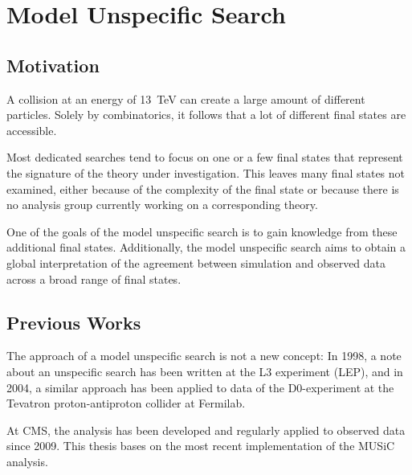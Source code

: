
\chapter{Model Unspecific Search}

\section{Motivation}
A collision at an energy of \SI{13}{\TeV} can create a large amount of different particles. Solely by combinatorics, it follows that a lot of different final states are accessible.

Most dedicated searches tend to focus on one or a few final states that represent the signature of the theory under investigation. This leaves many final states not examined, either because of the complexity of the final state or because there is no analysis group currently working on a corresponding theory.

One of the goals of the model unspecific search is to gain knowledge from these additional final states. Additionally, the model unspecific search aims to obtain a global interpretation of the agreement between simulation and observed data across a broad range of final states.

\section{Previous Works}
The approach of a model unspecific search is not a new concept: In 1998, a note about an unspecific search has been written at the L3 experiment (\ac{LEP})\cite{Hebbeker:GlobalComparisonL3}, and in 2004, a similar approach has been applied to data of the D0-experiment at the Tevatron proton-antiproton collider at Fermilab\cite{Biallass:ModelIndependentSearch}.

At \ac{CMS}, the analysis has been developed and regularly applied to observed data since 2009\cite{Schmitz:ModelUnspecificSearch,Hof:ImplementationModelIndependent,Dietz-Laursonn:ModelUnspecificSearch,Olschewski:StudyAlternativeStatistical,Brodski:ModelUnspecificSearch,Pieta:MUSiCModelUnspecific,Papacz:ModelUnspecificSearch,Albert:ExtensionModelUnspecific,Roemer:ModelUnspecificSearch,CMS:CMS-PAS-EXO-14-016,Knutzen:softwarereinterpretationmodel,Durchardt:MUSiCModelUnspecific}. 
This thesis bases on the most recent implementation of the \ac{MUSiC} analysis.

